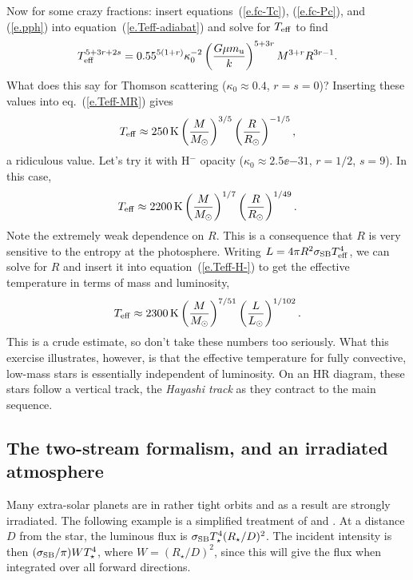 Now for some crazy fractions: insert equations~(\ref{e.fc-Tc}), (\ref{e.fc-Pc}), and (\ref{e.pph}) into equation~(\ref{e.Teff-adiabat}) and solve for $T_{\mathrm{eff}}$ to find
\begin{equation}\label{e.Teff-MR}
T_{\mathrm{eff}}^{5+3r+2s} = 0.55^{5(1+r)}\kappa_{0}^{-2} \left(\frac{G\mu m_\mathrm{u}}{k}\right)^{5+3r}M^{3+r} R^{3r-1}.
\end{equation}
What does this say for Thomson scattering ($\kappa_{0} \approx 0.4$, $r=s=0$)? Inserting these values into eq.~(\ref{e.Teff-MR}) gives
\begin{equation}\label{e.Teff-th}
	T_{\mathrm{eff}} \approx 250\,\mathrm{K} \left(\frac{M}{M_\odot}\right)^{3/5}\left(\frac{R}{R_{\odot}}\right)^{-1/5},
\end{equation}
a ridiculous value. Let's try it with H$^{-}$ opacity ($\kappa_{0} \approx 2.5\ee{-31}$, $r=1/2$, $s=9$). In this case,
\begin{equation}\label{e.Teff-H-}
 T_{\mathrm{eff}} \approx 2200\,\mathrm{K} \left(\frac{M}{M_\odot}\right)^{1/7}\left(\frac{R}{R_{\odot}}\right)^{1/49}.
\end{equation}
Note the extremely weak dependence on $R$.  This is a consequence that $R$ is very sensitive to the entropy at the photosphere.  Writing $L = 4\pi R^{2}\sigma_{\mathrm{SB}} T_{\mathrm{eff}}^{4}$, we can solve for $R$ and insert it into equation~(\ref{e.Teff-H-}) to get the effective temperature in terms of mass and luminosity,
\begin{equation}\label{e.Hayashi}
 T_{\mathrm{eff}} \approx 2300\,\mathrm{K} \left(\frac{M}{M_\odot}\right)^{7/51}\left(\frac{L}{L_{\odot}}\right)^{1/102}.
\end{equation}
This is a crude estimate, so don't take these numbers too seriously. What this exercise illustrates, however, is that the effective temperature for fully convective, low-mass stars is essentially independent of luminosity.  On an HR diagram, these stars follow a vertical track, the \emph{Hayashi track} as they contract to the main sequence.

\subsection{The two-stream formalism, and an irradiated atmosphere}\label{s.two-stream}

Many extra-solar planets are in rather tight orbits and as a result are strongly irradiated.  The following example is a simplified treatment of \citet{Hummer1982The-effect-of-r} and \citet{Hubeny2003A-Possible-Bifu}. At a distance $D$ from the star, the luminous flux is $\sigma_{\mathrm{SB}} T_{\star}^{4}(R_{\star}/D)^{2}$. The incident intensity is then $(\sigma_{\mathrm{SB}}/\pi)WT_{\star}^{4}$, where $W = (R_{\star}/D)^{2}$, since this will give the flux when integrated over all forward directions. 

